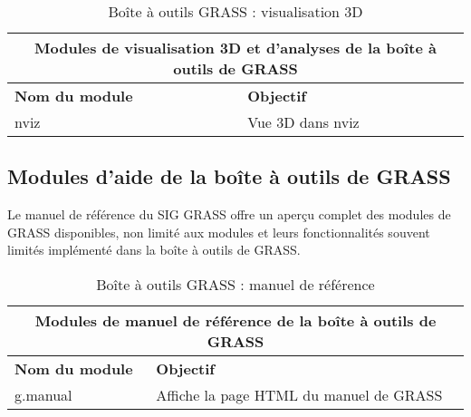 \begin{table}[H]
\centering
 \begin{tabular}{|p{4cm}|p{10cm}|}
  \hline \multicolumn{2}{|c|}{\textbf{Modules de visualisation 3D et d'analyses de la boîte à outils de GRASS}} \\
  \hline \textbf{Nom du module} & \textbf{Objectif} \\
  \hline nviz & Vue 3D dans nviz\\
\hline
\end{tabular}
\caption{Boîte à outils GRASS : visualisation 3D}
\end{table}

\subsection{Modules d'aide de la boîte à outils de GRASS}

Le manuel de référence du SIG GRASS offre un aper\c{c}u complet des modules de GRASS disponibles, non limité aux modules et leurs fonctionnalités souvent limités implémenté dans la boîte à outils de GRASS.

\begin{table}[H]
\centering
 \begin{tabular}{|p{4cm}|p{10cm}|}
  \hline \multicolumn{2}{|c|}{\textbf{Modules de manuel de référence de la boîte à outils de GRASS}} \\
  \hline \textbf{Nom du module} & \textbf{Objectif} \\
  \hline g.manual & Affiche la page HTML du manuel de GRASS \\
\hline
\end{tabular}
\caption{Boîte à outils GRASS : manuel de référence}
\end{table}
